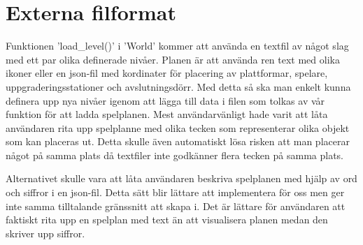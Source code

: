 \documentclass{TDP005mall}
\begin{document}
\section{Externa filformat} 
Funktionen 'load\_level()' i 'World' kommer att använda en textfil av något slag med ett par olika definerade nivåer. Planen är att använda ren text med olika ikoner eller en json-fil med kordinater för placering av plattformar, spelare, uppgraderingsstationer och avslutningsdörr. Med detta så ska man enkelt kunna definera upp nya nivåer igenom att lägga till data i filen som tolkas av vår funktion för att ladda spelplanen. Mest användarvänligt hade varit att låta användaren rita upp spelplanne med olika tecken som representerar olika objekt som kan placeras ut. Detta skulle även automatiskt lösa risken att man placerar något på samma plats då textfiler inte godkänner flera tecken på samma plats.

Alternativet skulle vara att låta användaren beskriva spelplanen med hjälp av ord och siffror i en json-fil. Detta sätt blir lättare att implementera för oss men ger inte samma tilltalande gränssnitt att skapa i. Det är lättare för användaren att faktiskt rita upp en spelplan med text än att visualisera planen medan den skriver upp siffror.
\end{document}

